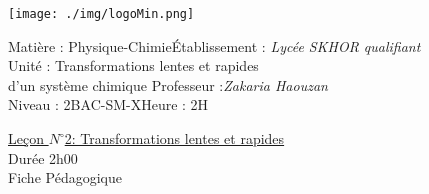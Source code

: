 \documentclass[12pt]{article}
\newcommand\headerMe[2]{\noindent{}#1\hfill#2}
\begin{document}
\begin{center}
\texttt{[image: ./img/logoMin.png]}
\vspace{-3cm}
\end{center}
\headerMe{Matière : Physique-Chimie}{Établissement : \emph{Lycée SKHOR qualifiant}}\\
\headerMe{ Unité : Transformations lentes et rapides\\d’un système chimique }{  Professeur :\emph{Zakaria Haouzan}}\\
\headerMe{Niveau : 2BAC-SM-X}{Heure : 2H}\\

\begin{center}
	\underline{Leçon $N^{\circ}$2: Transformations lentes et rapides}\\
Durée 2h00
\\
    \vspace{.2cm}
\hrulefill
\Large{Fiche Pédagogique}
\hrulefill\\
\end{center}
\end{document}
